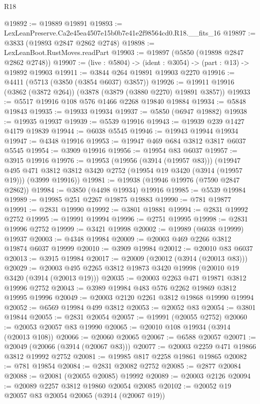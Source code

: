\begin{lexlean}{R18}
\begin{coremodule}
@19892 := @19889 @19891
@19893 := LexLeanPreserve.Ca2e45ea4507e15b0b7e41e2f98564cd0.R18.__fits_16
@19897 := @3833 (@19893 @2847 @2862 @2748)
@19898 := LexLeanBoot.RustMoves.readPart
@19903 := @19897 (@5850 (@19898 @2847 @2862 @2748))
@19907 := (live : @5804) -> (ident : @3054) -> (part : @13) -> @19892 @19903
@19911 := @3844 @264 @19891 @19903 @2270
@19916 := @4411 (@5713 (@3850 (@3854 @6037) @3857))
@19926 := @19911 @19916 (@3862 (@3872 @264)) (@3878 (@3879 (@3880 @2270) @19891 @3857))
@19933 := @5517 @19916 @108 @576 @1466 @2268 @19840 @19884
@19934 := @5848 @19843
@19935 := @19933 @19934
@19937 := @5850 (@6947 @19882)
@19938 := @19935 @19937
@19939 := @5539 @19916
@19943 := @19939 @239 @1427 @4179 @19839
@19944 := @6038 @5545
@19946 := @19943 @19944 @19934
@19947 := @4348 @19916
@19953 := @19947 @469 @684 @3812 @3817 @6037 @5545
@19954 := @3909 @19916
@19956 := @19954 @83 @6037
@19957 := @3915 @19916
@19976 := @19953
    (@19956 (@3914 (@19957 @83)))
    (@19947
      @495
      @471
      @3812
      @3812
      @3420
      @2752
      (@19954 @19 @3420 (@3914 (@19957 @19)))
      (@3999 @19916))
@19981 := @19938 (@19946 @19976 (@7590 @2847 @2862))
@19984 := @3850 (@4498 @19934) @19916
@19985 := @5539 @19984
@19989 := @19985 @251 @2267 @19875 @19883
@19990 := @781 @19877
@19991 := @2831 @19990
@19992 := @3801 @19881
@19994 := @2831 @19992 @2752
@19995 := @19991 @19994
@19996 := @2751 @19995
@19998 := @2831 @19996 @2752
@19999 := @3421 @19998
@20002 := @19989 (@6038 @19999) @19937
@20003 := @4348 @19984
@20009 := @20003 @469 @2266 @3812 @19874 @6037 @19999
@20010 := @3909 @19984
@20012 := @20010 @83 @6037
@20013 := @3915 @19984
@20017 := @20009 (@20012 (@3914 (@20013 @83)))
@20029 := @20003 @495 @2265 @3812 @19873 @3420 @19998 (@20010 @19 @3420 (@3914 (@20013 @19)))
@20035 := @20003 @2263 @471 @19871 @3812 @19996 @2752
@20043 := @3989 @19984 @483 @576 @2262 @19869 @3812 @19995 @19996
@20049 := @20003 @2120 @2261 @3812 @19868 @19990 @19994
@20052 := @6569 @19984 @499 @3812
@20053 := @20052 @83
@20054 := @3801 @19844
@20055 := @2831 @20054
@20057 := @19991 (@20055 @2752)
@20060 := @20053 @20057 @83 @19990
@20065 := @20010 @108 @19934 (@3914 (@20013 @108))
@20066 := @20060 @20065
@20067 := @6588 @20057
@20071 := @20049 (@20066 (@3914 (@20067 @83)))
@20077 := @20003 @2259 @471 @19866 @3812 @19992 @2752
@20081 := @19985 @817 @2258 @19861 @19865
@20082 := @781 @19854
@20084 := @2831 @20082 @2752
@20085 := @2877 @20084
@20088 := @20081 (@20055 @20085) @19992
@20089 := @20003 @2126
@20094 := @20089 @2257 @3812 @19860 @20054 @20085
@20102 := @20052 @19 @20057 @83 @20054 @20065 (@3914 (@20067 @19))

\end{coremodule}
\end{lexlean}
